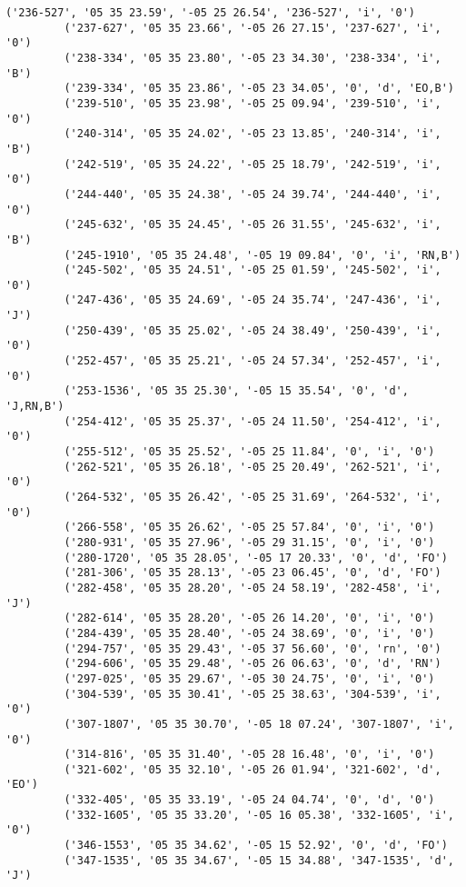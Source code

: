 \documentclass{article}
\begin{document}
\begin{Verbatim}[commandchars=\\\{\}]
         ('236-527', '05 35 23.59', '-05 25 26.54', '236-527', 'i', '0')
         ('237-627', '05 35 23.66', '-05 26 27.15', '237-627', 'i', '0')
         ('238-334', '05 35 23.80', '-05 23 34.30', '238-334', 'i', 'B')
         ('239-334', '05 35 23.86', '-05 23 34.05', '0', 'd', 'EO,B')
         ('239-510', '05 35 23.98', '-05 25 09.94', '239-510', 'i', '0')
         ('240-314', '05 35 24.02', '-05 23 13.85', '240-314', 'i', 'B')
         ('242-519', '05 35 24.22', '-05 25 18.79', '242-519', 'i', '0')
         ('244-440', '05 35 24.38', '-05 24 39.74', '244-440', 'i', '0')
         ('245-632', '05 35 24.45', '-05 26 31.55', '245-632', 'i', 'B')
         ('245-1910', '05 35 24.48', '-05 19 09.84', '0', 'i', 'RN,B')
         ('245-502', '05 35 24.51', '-05 25 01.59', '245-502', 'i', '0')
         ('247-436', '05 35 24.69', '-05 24 35.74', '247-436', 'i', 'J')
         ('250-439', '05 35 25.02', '-05 24 38.49', '250-439', 'i', '0')
         ('252-457', '05 35 25.21', '-05 24 57.34', '252-457', 'i', '0')
         ('253-1536', '05 35 25.30', '-05 15 35.54', '0', 'd', 'J,RN,B')
         ('254-412', '05 35 25.37', '-05 24 11.50', '254-412', 'i', '0')
         ('255-512', '05 35 25.52', '-05 25 11.84', '0', 'i', '0')
         ('262-521', '05 35 26.18', '-05 25 20.49', '262-521', 'i', '0')
         ('264-532', '05 35 26.42', '-05 25 31.69', '264-532', 'i', '0')
         ('266-558', '05 35 26.62', '-05 25 57.84', '0', 'i', '0')
         ('280-931', '05 35 27.96', '-05 29 31.15', '0', 'i', '0')
         ('280-1720', '05 35 28.05', '-05 17 20.33', '0', 'd', 'FO')
         ('281-306', '05 35 28.13', '-05 23 06.45', '0', 'd', 'FO')
         ('282-458', '05 35 28.20', '-05 24 58.19', '282-458', 'i', 'J')
         ('282-614', '05 35 28.20', '-05 26 14.20', '0', 'i', '0')
         ('284-439', '05 35 28.40', '-05 24 38.69', '0', 'i', '0')
         ('294-757', '05 35 29.43', '-05 37 56.60', '0', 'rn', '0')
         ('294-606', '05 35 29.48', '-05 26 06.63', '0', 'd', 'RN')
         ('297-025', '05 35 29.67', '-05 30 24.75', '0', 'i', '0')
         ('304-539', '05 35 30.41', '-05 25 38.63', '304-539', 'i', '0')
         ('307-1807', '05 35 30.70', '-05 18 07.24', '307-1807', 'i', '0')
         ('314-816', '05 35 31.40', '-05 28 16.48', '0', 'i', '0')
         ('321-602', '05 35 32.10', '-05 26 01.94', '321-602', 'd', 'EO')
         ('332-405', '05 35 33.19', '-05 24 04.74', '0', 'd', '0')
         ('332-1605', '05 35 33.20', '-05 16 05.38', '332-1605', 'i', '0')
         ('346-1553', '05 35 34.62', '-05 15 52.92', '0', 'd', 'FO')
         ('347-1535', '05 35 34.67', '-05 15 34.88', '347-1535', 'd', 'J')

\end{Verbatim}
\end{document}
